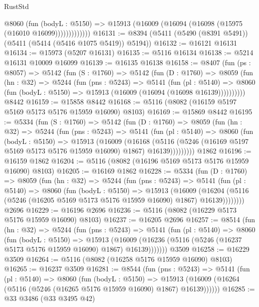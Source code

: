 \begin{lexlean}{RustStd}
\begin{coremodule}
{\begin{coremodule}
{{{{{{{{{{{{{{{{{{{{{{{{{{{{{{{                @8060
                  (fun (bodyL : @5150) =>
                  @15913 (@16009 (@16094 (@16098 (@15975 (@16010 @16099)))))))))))))
@16131 := @8394 (@5411 (@5490 (@8391 @5491)) (@5411 (@5414 (@5416 @1075 @5419)) @5194))
@16132 := @16121 @16131
@16134 := @15973 (@5207 @16131)
@16135 := @5116 @16134
@16138 := @5214 @16131 @10009 @16099
@16139 := @16135 @16138
@16158 := @8407
    (fun (ps : @8057) =>
    @5142
      (fun (S : @1760) =>
      @5142
        (fun (D : @1760) =>
        @8059
          (fun (hn : @32) =>
          @5244
            (fun (pns : @5243) =>
            @5141
              (fun (pl : @5140) =>
              @8060 (fun (bodyL : @5150) => @15913 (@16009 (@16094 (@16098 @16139))))))))))
    @8442
@16159 := @15858 @8442
@16168 := @5116 (@8082 (@16159 @5197 @5169 @5173 @5176 @15959 @16090) @8103)
@16169 := @15869 @8442
@16195 := @5334
    (fun (S : @1760) =>
    @5142
      (fun (D : @1760) =>
      @8059
        (fun (hn : @32) =>
        @5244
          (fun (pns : @5243) =>
          @5141
            (fun (pl : @5140) =>
            @8060
              (fun (bodyL : @5150) =>
              @15913
                (@16009
                  (@16168
                    (@5116
                      (@5246 (@16169 @5197 @5169 @5173 @5176 @15959 @16090) @1867)
                      @16139)))))))))
    @1862
@16196 := @16159 @1862
@16204 := @5116 (@8082 (@16196 @5169 @5173 @5176 @15959 @16090) @8103)
@16205 := @16169 @1862
@16228 := @5334
    (fun (D : @1760) =>
    @8059
      (fun (hn : @32) =>
      @5244
        (fun (pns : @5243) =>
        @5141
          (fun (pl : @5140) =>
          @8060
            (fun (bodyL : @5150) =>
            @15913
              (@16009
                (@16204 (@5116 (@5246 (@16205 @5169 @5173 @5176 @15959 @16090) @1867) @16139))))))))
    @2696
@16229 := @16196 @2696
@16236 := @5116 (@8082 (@16229 @5173 @5176 @15959 @16090) @8103)
@16237 := @16205 @2696
@16257 := @8514
    (fun (hn : @32) =>
    @5244
      (fun (pns : @5243) =>
      @5141
        (fun (pl : @5140) =>
        @8060
          (fun (bodyL : @5150) =>
          @15913
            (@16009 (@16236 (@5116 (@5246 (@16237 @5173 @5176 @15959 @16090) @1867) @16139)))))))
    @3509
@16258 := @16229 @3509
@16264 := @5116 (@8082 (@16258 @5176 @15959 @16090) @8103)
@16265 := @16237 @3509
@16281 := @8544
    (fun (pns : @5243) =>
    @5141
      (fun (pl : @5140) =>
      @8060
        (fun (bodyL : @5150) =>
        @15913 (@16009 (@16264 (@5116 (@5246 (@16265 @5176 @15959 @16090) @1867) @16139))))))
@16285 := @33 @3486 (@33 @3495 @42)
}}}}}}}}}}}}}}}}}}}}}}}}}}}}}}}
\end{coremodule}}
\end{coremodule}
\end{lexlean}
